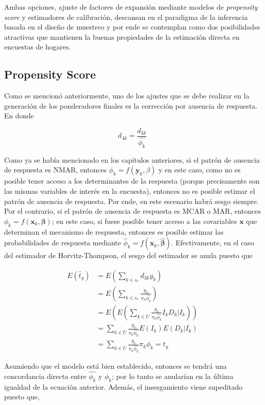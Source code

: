 \documentclass[
  12pt,
  spanish,
]{book}
\begin{document}
Ambas opciones, ajuste de factores de expansión mediante modelos de \emph{propensity score} y estimadores de calibración, descansan en el paradigma de la inferencia basada en el diseño de muestreo y por ende se contemplan como dos posibilidades atractivas que mantienen la buenas propiedades de la estimación directa en encuestas de hogares.

\hypertarget{propensity-score}{%
\subsection{Propensity Score}\label{propensity-score}}

Como se mencionó anteriormente, uno de los ajustes que se debe realizar en la generación de los ponderadores finales es la corrección por ausencia de respuesta. En donde

\[d_{4k} =  \frac{d_{3k}}{\hat{\phi_k}}\]

Como ya se había mencionado en los capítulos anteriores, si el patrón de ausencia de respuesta es NMAR, entonces \(\phi_k = f(\mathbf{y}_k, \beta)\) y en este caso, como no es posible tener acceso a los determinantes de la respuesta (porque precisamente son las mismas variables de interés en la encuesta), entonces no es posible estimar el patrón de ausencia de respuesta. Por ende, en este escenario habrá sesgo siempre. Por el contrario, si el patrón de ausencia de respuesta es MCAR o MAR, entonces \(\phi_k = f(\mathbf{x}_k, \boldsymbol{\beta})\); en este caso, si fuese posible tener acceso a las covariables \(\mathbf{x}\) que determinan el mecanismo de respuesta, entonces es posible estimar las probabilidades de respuesta mediante \(\hat{\phi}_k = f(\mathbf{x}_k, \hat{\boldsymbol{\beta}})\). Efectivamente, en el caso del estimador de Horvitz-Thompson, el sesgo del estimador se anula puesto que

\begin{align*}
E(\hat{t}_y) &= E\left(\sum_{k\in s_r}d_{3k}y_k\right) \\
&= E\left(\sum_{k\in s_r}\frac{y_k}{\pi_k \hat{\phi_k}}\right)\\
&= E\left(E\left(\sum_{k\in U}\frac{y_k}{\pi_k \hat{\phi_k}}I_kD_k|I_k\right)\right)\\
&= \sum_{k\in U}\frac{y_k}{\pi_k \hat{\phi_k}}E\left(I_k\right)E\left(D_k|I_k\right)\\
&= \sum_{k\in U}\frac{y_k}{\pi_k \hat{\phi_k}}\pi_k\phi_k = t_y
\end{align*}

Asumiendo que el modelo está bien establecido, entonces se tendrá una concordancia directa entre \(\hat{\phi_k}\) y \(\phi_k\); por lo tanto se anularían en la última igualdad de la ecuación anterior. Además, el insesgamiento viene supeditado puesto que,
\end{document}
